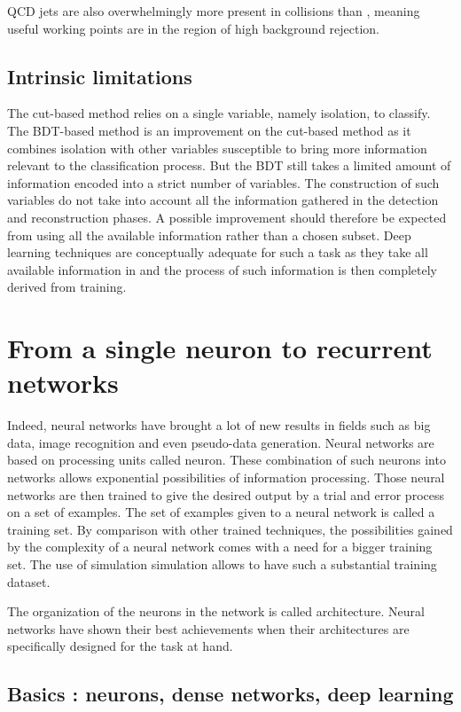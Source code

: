 QCD jets are also overwhelmingly more present in collisions than \tauh, meaning useful working points are in the region of high background rejection. 

\subsection{Intrinsic limitations}

The cut-based method relies on a single variable, namely isolation, to classify. The BDT-based method is an improvement on the cut-based method as it combines isolation with other variables susceptible to bring more information relevant to the classification process. But the BDT still takes a limited amount of information encoded into a strict number of variables. The construction of such variables do not take into account all the information gathered in the detection and reconstruction phases. A possible improvement should therefore be expected from using all the available information rather than a chosen subset. Deep learning techniques are conceptually adequate for such a task as they take all available information in and the process of such information is then completely derived from training.


\section{From a single neuron to recurrent networks}
\label{sec:NN}
Indeed, neural networks have brought a lot of new results in fields such as big data, image recognition and even pseudo-data generation.
Neural networks are based on processing units called neuron. These combination of such neurons into networks allows exponential possibilities of information processing. Those neural networks are then trained to give the desired output by a trial and error process on a set of examples. The set of examples given to a neural network is called a training set. By comparison with other trained techniques, the possibilities gained by the complexity of a neural network comes with a need for a bigger training set. The use of simulation simulation allows to have such a substantial training dataset.

The organization of the neurons in the network is called architecture. Neural networks have shown their best achievements when their architectures are specifically designed for the task at hand.

\subsection{Basics : neurons, dense networks, deep learning}

